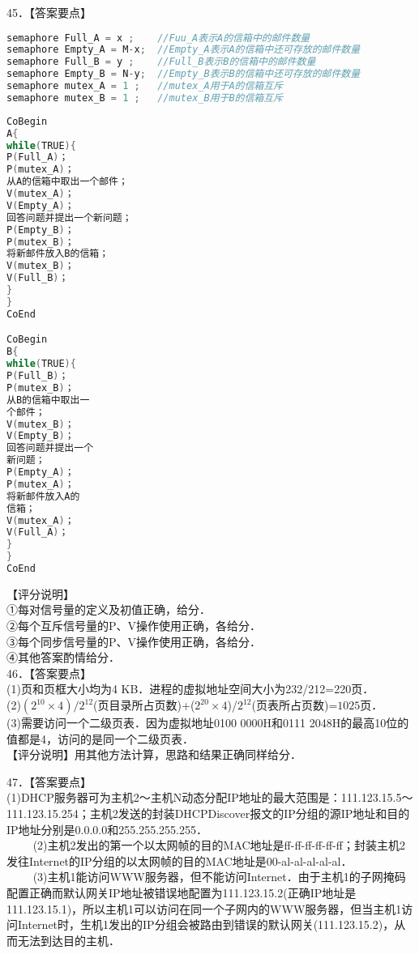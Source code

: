 45．【答案要点】\\
\begin{lstlisting}[language=cpp]
semaphore Full_A = x ;    //Fuu_A表示A的信箱中的邮件数量
semaphore Empty_A = M-x;  //Empty_A表示A的信箱中还可存放的邮件数量
semaphore Full_B = y ;    //Full_B表示B的信箱中的邮件数量
semaphore Empty_B = N-y;  //Empty_B表示B的信箱中还可存放的邮件数量
semaphore mutex_A = 1 ;   //mutex_A用于A的信箱互斥
semaphore mutex_B = 1 ;   //mutex_B用于B的信箱互斥
\end{lstlisting}
\begin{lstlisting}[language=cpp]
CoBegin
A{
while(TRUE){
P(Full_A)；
P(mutex_A)；
从A的信箱中取出一个邮件；
V(mutex_A)；
V(Empty_A)；
回答问题并提出一个新问题；
P(Empty_B)；
P(mutex_B)；
将新邮件放入B的信箱；
V(mutex_B)；
V(Full_B)；
}
}
CoEnd

CoBegin
B{
while(TRUE){
P(Full_B)；
P(mutex_B)；
从B的信箱中取出一
个邮件；
V(mutex_B)；
V(Empty_B)；
回答问题并提出一个
新问题；
P(Empty_A)；
P(mutex_A)；
将新邮件放入A的
信箱；
V(mutex_A)；
V(Full_A)；
}
}
CoEnd
\end{lstlisting}
【评分说明】\\
①每对信号量的定义及初值正确，给分．\\
②每个互斥信号量的P、V操作使用正确，各给分．\\
③每个同步信号量的P、V操作使用正确，各给分．\\
④其他答案酌情给分．\\

46．【答案要点】\\
(1)页和页框大小均为4 KB．进程的虚拟地址空间大小为232/212=220页．\\
(2)$(2^{10}\times4)/2^{12}$(页目录所占页数)+($2^{20}\times4$)/$2^{12}$(页表所占页数)=$1025$页．\\
(3)需要访问一个二级页表．因为虚拟地址0100 0000H和0111 2048H的最高10位的值都是4，访问的是同一个二级页表．\\
【评分说明】用其他方法计算，思路和结果正确同样给分．

47．【答案要点】\\
(1)DHCP服务器可为主机2～主机N动态分配IP地址的最大范围是：111.123.15.5～111.123.15.254；主机2发送的封装DHCPDiscover报文的IP分组的源IP地址和目的IP地址分别是0.0.0.0和255.255.255.255．\\
$\qquad$ (2)主机2发出的第一个以太网帧的目的MAC地址是ff-ff-ff-ff-ff-ff；封装主机2发往Internet的IP分组的以太网帧的目的MAC地址是00-al-al-al-al-al．\\
$\qquad$ (3)主机1能访问WWW服务器，但不能访问Internet．由于主机1的子网掩码配置正确而默认网关IP地址被错误地配置为111.123.15.2(正确IP地址是111.123.15.1)，所以主机1可以访问在同一个子网内的WWW服务器，但当主机1访问Internet时，生机1发出的IP分组会被路由到错误的默认网关(111.123.15.2)，从而无法到达目的主机．